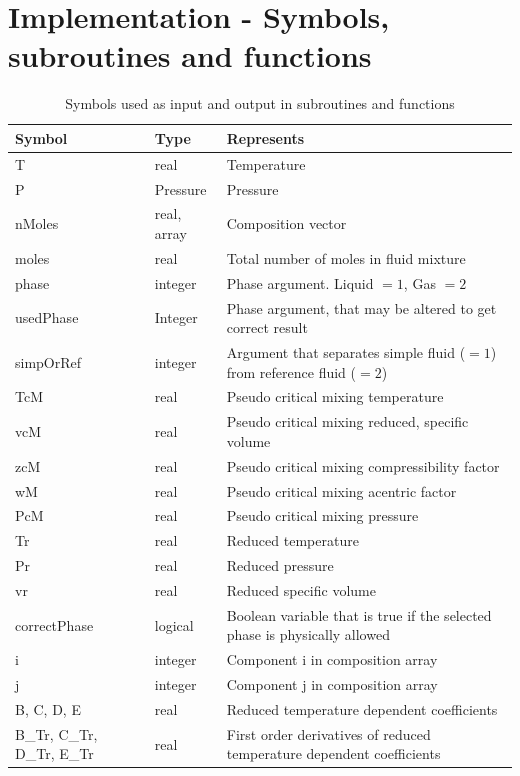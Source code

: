 \documentclass[internal,english]{sintefmemo2012}
\numberwithin{equation}{section}
\begin{document}
\section{Implementation - Symbols, subroutines and functions}
\label{app:subFunc}
\renewcommand{\arraystretch}{1.2}
\begin{table}[h!]
\begin{center}
\caption{Symbols used as input and output in subroutines and functions}
\label{tab:symbols}
\begin{tabular}{p{2.8cm} l p{8cm}}
\hline
Symbol	& Type		& Represents 			\\
\hline
T		& real		& Temperature 			\\
P		& Pressure 	& Pressure 				\\
nMoles 	& real, array & Composition vector 	\\
moles	& real		& Total number of moles in fluid mixture \\
phase	& integer	& Phase argument. Liquid $= 1$, Gas $= 2$ \\
usedPhase & Integer	& Phase argument, that may be altered to get correct result \\
simpOrRef & integer	& Argument that separates simple fluid ($= 1$) from reference fluid ($= 2$) \\
TcM		& real		& Pseudo critical mixing temperature \\
vcM		& real		& Pseudo critical mixing reduced, specific volume \\
zcM		& real		& Pseudo critical mixing compressibility factor \\
wM		& real		& Pseudo critical mixing acentric factor \\
PcM		& real		& Pseudo critical mixing pressure \\
Tr		& real		& Reduced temperature 	\\ 
Pr		& real		& Reduced pressure		\\
vr		& real		& Reduced specific volume \\
correctPhase	& logical	& Boolean variable that is true if the selected phase is physically allowed \\
i		& integer	& Component i in composition array \\
j		& integer	& Component j in composition array \\
B, C, D, E & real	& Reduced temperature dependent coefficients \\
B\_Tr, C\_Tr, D\_Tr, E\_Tr & real	& First order derivatives of reduced temperature dependent coefficients \\

\end{tabular}
\end{center}
\end{table}
\end{document}
